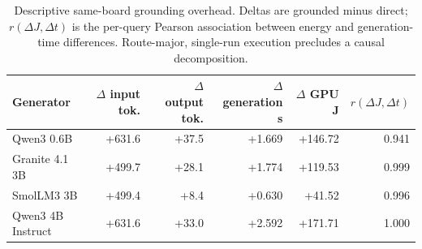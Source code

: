 \begin{table}[t]
\caption{Descriptive same-board grounding overhead. Deltas are grounded minus direct; $r(\Delta J,\Delta t)$ is the per-query Pearson association between energy and generation-time differences. Route-major, single-run execution precludes a causal decomposition.}
\label{tab:energy-mechanism}
\centering
\small
\begin{tabular}{@{}lrrrrr@{}}
\toprule
Generator & $\Delta$ input tok. & $\Delta$ output tok. & $\Delta$ generation s & $\Delta$ GPU J & $r(\Delta J,\Delta t)$ \\
\midrule
Qwen3 0.6B & +631.6 & +37.5 & +1.669 & +146.72 & 0.941 \\
Granite 4.1 3B & +499.7 & +28.1 & +1.774 & +119.53 & 0.999 \\
SmolLM3 3B & +499.4 & +8.4 & +0.630 & +41.52 & 0.996 \\
Qwen3 4B Instruct & +631.6 & +33.0 & +2.592 & +171.71 & 1.000 \\
\bottomrule
\end{tabular}
\end{table}
